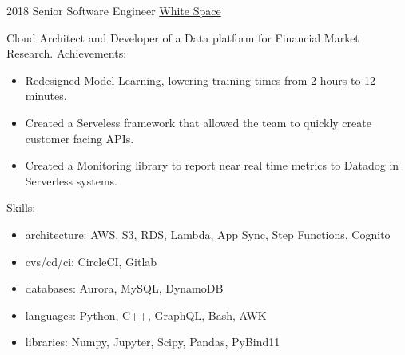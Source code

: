 \documentclass[11pt,a4paper]{moderncv}
\begin{document}
    \cventry
        {2018}
        {Senior Software Engineer}
        {\href{https://www.white.space}{White Space}} {} {}
        {
            Cloud Architect and Developer of a Data platform for Financial Market Research.
            Achievements:
            \begin{itemize}
                \item Redesigned Model Learning, lowering training times from 2
                      hours to 12 minutes.
                \item Created a Serveless framework that allowed the team to
                      quickly create customer facing APIs.
                \item Created a Monitoring library to report near real time
                      metrics to Datadog in Serverless systems.
            \end{itemize}
            Skills:
            \begin{itemize}
                \item architecture: AWS, S3, RDS, Lambda, App Sync, Step Functions, Cognito
                \item cvs/cd/ci: CircleCI, Gitlab
                \item databases: Aurora, MySQL, DynamoDB
                \item languages: Python, C++, GraphQL, Bash, AWK
                \item libraries: Numpy, Jupyter, Scipy, Pandas, PyBind11
            \end{itemize}
        }
\end{document}
